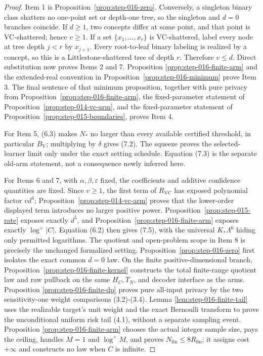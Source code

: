 \begin{proof}
Item 1 is Proposition~\ref{prop:step-016-zero}. Conversely, a
singleton binary class shatters no one-point set or depth-one tree, so the
singleton and \(d=0\) branches coincide. If \(d\ge1\), two concepts differ
at some point, and that point is VC-shattered; hence \(v\ge1\). If a set
\(\{x_1,\ldots,x_r\}\) is VC-shattered, label every node at tree depth
\(j<r\) by \(x_{j+1}\). Every root-to-leaf binary labeling is realized by
a concept, so this is a Littlestone-shattered tree of depth \(r\). Therefore
\(v\le d\). Direct substitution now proves Items 2 and 7. Proposition
\ref{prop:step-016-finite-arm} and the extended-real convention in
Proposition~\ref{prop:step-016-minimum} prove Item 3. The final sentence of
that minimum proposition, together with pure privacy from
Proposition~\ref{prop:step-016-finite-arm}, the fixed-parameter statement of
Proposition~\ref{prop:step-014-vc-arm}, and the fixed-parameter
statement of Proposition~\ref{prop:step-015-boundaries}, proves
Item 4.

For Item 5, (6.3) makes \(N_*\) no larger than every available certified
threshold, in particular \(B_{\mathrm V}\); multiplying by \(\delta\) gives
(7.2). The squeeze proves the selected-learner limit only under the exact
setting schedule. Equation (7.3) is the separate  old-arm statement,
not a consequence newly inferred here.

For Items 6 and 7, with \(\alpha,\beta,\varepsilon\) fixed, the coefficients
and additive confidence quantities are fixed. Since \(v\ge1\), the first
term of \(R_{\mathrm{VC}}\) has exposed polynomial factor \(vd^4\); Proposition~\ref{prop:step-014-vc-arm} proves that the lower-order displayed
term introduces no larger positive power. Proposition~\ref{prop:step-015-rate} exposes exactly \(d^5\), and
Proposition~\ref{prop:step-016-finite-arm} exposes exactly
\(\log^+|C|\). Equation (6.2) then gives (7.5), with the universal
\(K_*\Lambda^6\) hiding only permitted logarithms. The quotient and
open-problem scope in Item 8 is precisely the unchanged formalized setting.
Proposition~\ref{prop:step-016-zero} first isolates the exact common
\(d=0\) law. On the finite positive-dimensional branch,
Proposition~\ref{prop:step-016-finite-kernel} constructs the total
finite-range quotient law and raw pullback on the same \(H_C,T_N\), and
decoder interface as the  arms. Proposition
\ref{prop:step-016-finite-dp} proves pure all-input privacy by the two
sensitivity-one weight comparisons (3.2)-(3.4). Lemma
\ref{lem:step-016-finite-tail} uses the realizable target's unit weight and
the exact Bernoulli transform to prove the unconditional uniform risk tail
(4.1), without a separate sampling event. Proposition
\ref{prop:step-016-finite-arm} chooses the actual integer sample size, pays
the ceiling, handles \(M=1\) and \(\log^+M\), and proves
\(N_{\mathrm{fin}}\le8R_{\mathrm{fin}}\); it assigns cost \(+\infty\) and
constructs no law when \(C\) is infinite.


\end{proof}
